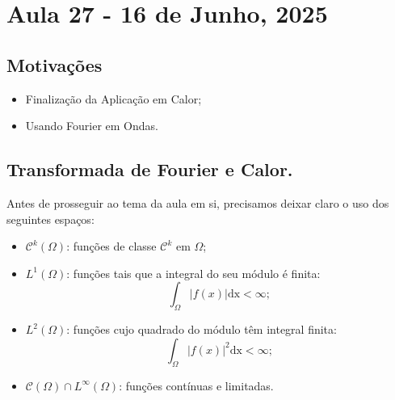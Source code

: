 \documentclass[../pde_notes.tex]{subfiles}
\begin{document}
\section{Aula 27 - 16 de Junho, 2025}
\subsection{Motivações}
\begin{itemize}
	\item Finalização da Aplicação em Calor;
	\item Usando Fourier em Ondas.
\end{itemize}
\subsection{Transformada de Fourier e Calor.}
Antes de prosseguir ao tema da aula em si, precisamos deixar claro o uso dos seguintes espaços:
\begin{itemize}
	\item \(\mathcal{C}^{k}(\Omega )\): funções de classe \(\mathcal{C}^{k}\) em \(\Omega \);
	\item \(L^{1}(\Omega )\): funções tais que a integral do seu módulo é finita:
	      \[
		      \int_{\Omega }^{}|f(x)| \mathrm{dx} < \infty;
	      \]
	\item \(L^{2}(\Omega )\): funções cujo quadrado do módulo têm integral finita:
	      \[
		      \int_{\Omega }^{}|f(x)|^{2} \mathrm{dx} < \infty;
	      \]
	\item \(\mathcal{C}(\Omega )\cap L^{\infty}(\Omega )\): funções contínuas e limitadas.
\end{itemize}
\end{document}
